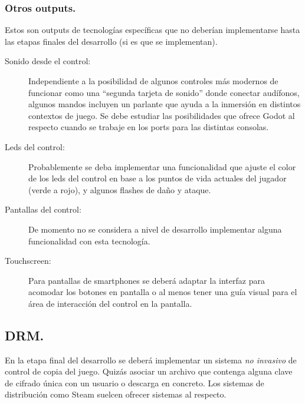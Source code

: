 \subsubsection{Otros outputs.}
Estos son outputs de tecnologías específicas que no deberían implementarse hasta las etapas finales del desarrollo (si es que se implementan).

\begin{description}
\item[Sonido desde el control:] Independiente a la posibilidad de algunos controles más modernos de funcionar como una “segunda tarjeta de sonido” donde conectar audífonos, algunos mandos incluyen un parlante que ayuda a la inmersión en distintos contextos de juego. Se debe estudiar las posibilidades que ofrece Godot al respecto cuando se trabaje en los ports para las distintas consolas.

\item[Leds del control:] Probablemente se deba implementar una funcionalidad que ajuste el color de los leds del control en base a los puntos de vida actuales del jugador (verde a rojo), y algunos flashes de daño y ataque.

\item[Pantallas del control:] De momento no se considera a nivel de desarrollo implementar alguna funcionalidad con esta tecnología.

\item[Touchscreen:] Para pantallas de smartphones se deberá adaptar la interfaz para acomodar los botones en pantalla o al menos tener una guía visual para el área de interacción del control en la pantalla.
\end{description}

\subsection{DRM.}
En la etapa final del desarrollo se deberá implementar un sistema \emph{no invasivo} de control de copia del juego. Quizás asociar un archivo que contenga alguna clave de cifrado única con un usuario o descarga en concreto. Los sistemas de distribución como Steam suelcen ofrecer sistemas al respecto.